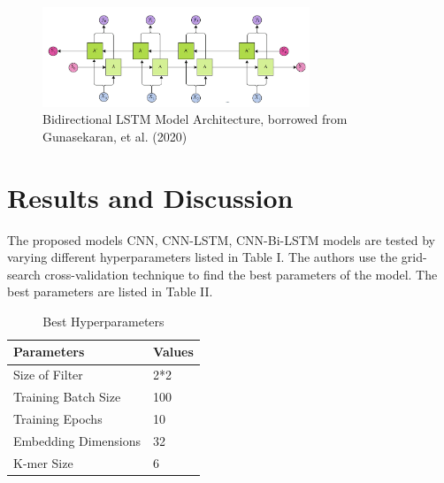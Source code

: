 \documentclass[journal]{IEEEtran}
\begin{document}
    \begin{figure}
      \centering
      \includegraphics[width=8cm]{figures/bi_lstm_cell.png}
      \caption{Bidirectional LSTM Model Architecture, borrowed from Gunasekaran, et al. (2020)}
    \end{figure}

\section{Results and Discussion}
  The proposed models CNN, CNN-LSTM, CNN-Bi-LSTM models are tested by varying different hyperparameters listed in Table I.
  The authors use the grid-search cross-validation technique to find the best parameters of the model.
  The best parameters are listed in Table II.

  \begin{table}
    \caption{\label{tab:table2}Best Hyperparameters}
    \centering
      \begin{tabular}{ || l l ||}
      \hline
      Parameters & Values \\
      \hline
      \hline
      Size of Filter       & 2*2 \\
      Training Batch Size  & 100 \\
      Training Epochs      & 10  \\
      Embedding Dimensions & 32  \\
      K-mer Size           & 6   \\
      \hline
      \end{tabular}%
  \end{table}
\end{document}

